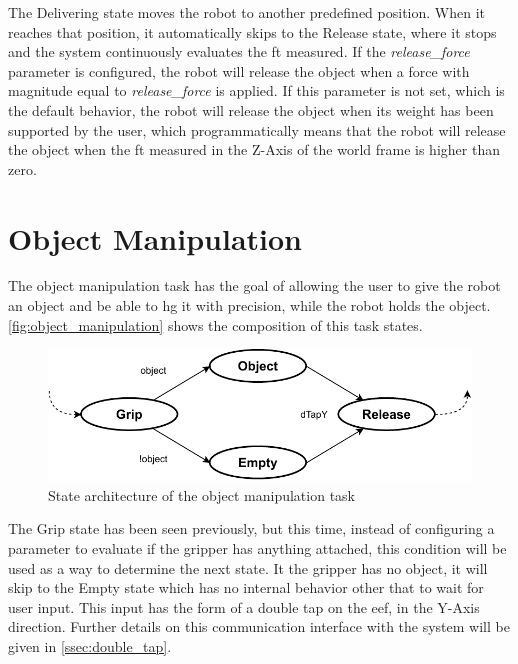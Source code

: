 \par The Delivering state moves the robot to another predefined position. When it reaches that position, it automatically skips to the Release state, where it stops and the system continuously evaluates the \ac{ft} measured. If the \textit{release\_force} parameter is configured, the robot will release the object when a force with magnitude equal to \textit{release\_force} is applied. If this parameter is not set, which is the default behavior, the robot will release the object when its weight has been supported by the user, which programmatically means that the robot will release the object when the \ac{ft} measured in the Z-Axis of the world frame is higher than zero. 






\section{Object Manipulation}


\par The object manipulation task has the goal of allowing the user to give the robot an object and be able to \ac{hg} it with precision, while the robot holds the object. \autoref{fig:object_manipulation} shows the composition of this task states.

\begin{figure}[h]
    \centering
    \includegraphics[width=0.7\linewidth]{figs/chp5/object_manipulation.pdf}
    \caption{State architecture of the object manipulation task}
    \label{fig:object_manipulation}
\end{figure}

\par The Grip state has been seen previously, but this time, instead of configuring a parameter to evaluate if the gripper has anything attached, this condition will be used as a way to determine the next state. It the gripper has no object, it will skip to the Empty state which has no internal behavior other that to wait for user input. This input has the form of a double tap on the \ac{eef}, in the Y-Axis direction. Further details on this communication interface with the system will be given in \autoref{ssec:double_tap}.

